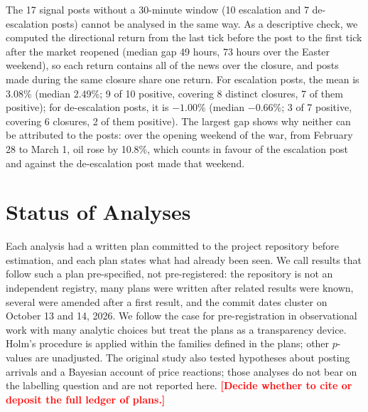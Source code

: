 \documentclass[11pt]{article}
\newcommand{\chk}[1]{\textcolor{red}{\textbf{[#1]}}}
\begin{document}
The 17 signal posts without a 30-minute window (10 escalation and 7 de-escalation posts) cannot be analysed in the same way. As a descriptive check, we computed the directional return from the last tick before the post to the first tick after the market reopened (median gap 49 hours, 73 hours over the Easter weekend), so each return contains all of the news over the closure, and posts made during the same closure share one return. For escalation posts, the mean is 3.08\% (median 2.49\%; 9 of 10 positive, covering 8 distinct closures, 7 of them positive); for de-escalation posts, it is $-1.00$\% (median $-0.66$\%; 3 of 7 positive, covering 6 closures, 2 of them positive). The largest gap shows why neither can be attributed to the posts: over the opening weekend of the war, from February 28 to March 1, oil rose by 10.8\%, which counts in favour of the escalation post and against the de-escalation post made that weekend.

\section{Status of Analyses}
\label{sec:status}

Each analysis had a written plan committed to the project repository before estimation, and each plan states what had already been seen. We call results that follow such a plan pre-specified, not pre-registered: the repository is not an independent registry, many plans were written after related results were known, several were amended after a first result, and the commit dates cluster on October 13 and 14, 2026. We follow the case for pre-registration in observational work with many analytic choices \citep{nosek2018} but treat the plans as a transparency device. Holm's \citeyearpar{holm1979} procedure is applied within the families defined in the plans; other $p$-values are unadjusted. The original study also tested hypotheses about posting arrivals and a Bayesian account of price reactions; those analyses do not bear on the labelling question and are not reported here. \chk{Decide whether to cite or deposit the full ledger of plans.}
\end{document}
